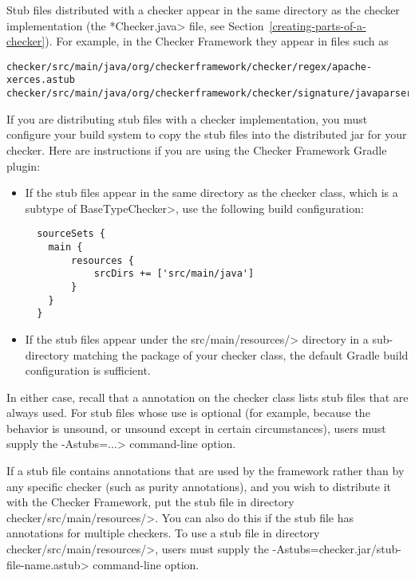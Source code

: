 Stub files distributed with a checker appear in the same directory as the
checker implementation (the \<*Checker.java> file, see
Section~\ref{creating-parts-of-a-checker}).  For example, in the Checker
Framework they appear in files such as
\begin{Verbatim}
checker/src/main/java/org/checkerframework/checker/regex/apache-xerces.astub
checker/src/main/java/org/checkerframework/checker/signature/javaparser.astub
\end{Verbatim}

If you are distributing stub files with a checker implementation, you must
configure your build system to copy the stub files into the distributed jar for
your checker.  Here are instructions if you are using the Checker Framework
Gradle plugin:
\begin{itemize}
\item
  If the stub files appear in the same directory as the checker class, which is
  a subtype of \<BaseTypeChecker>, use the following build configuration:
\begin{Verbatim}
  sourceSets {
    main {
        resources {
            srcDirs += ['src/main/java']
        }
    }
  }
\end{Verbatim}
\item
  If the stub files appear under the \<src/main/resources/>
  directory in a sub-directory matching the package of your checker class,
  the default Gradle build configuration is sufficient.
\end{itemize}
In either case, recall that a 
annotation on the checker class lists stub files that are always used.  For
stub files whose use is optional (for example, because the behavior is
unsound, or unsound except in certain circumstances), users must supply the
\<-Astubs=...> command-line option.


If a stub file contains annotations that are used by the framework rather
than by any specific checker (such as purity annotations), and you wish to
distribute it with the Checker Framework, put the stub file in directory
\<checker/src/main/resources/>.  You can also do this if the stub file has
annotations for multiple checkers.  To use a stub file in directory
\<checker/src/main/resources/>, users must supply the
\<-Astubs=checker.jar/stub-file-name.astub> command-line option.






